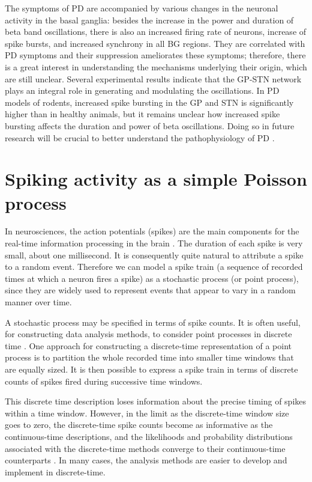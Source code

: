 \documentclass{kththesis}
\begin{document}
The symptoms of PD are accompanied by various changes in the neuronal activity in the basal ganglia: besides the increase in the power and duration of beta band oscillations, there is also an increased firing rate of neurons, increase of spike bursts, and increased synchrony in all BG regions. 
They are correlated with PD symptoms and their suppression ameliorates these symptoms; therefore, there is a great interest in understanding the mechanisms underlying their origin, which are still unclear. 
Several experimental results indicate that the GP-STN network plays an integral role in generating and modulating the oscillations.
In PD models of rodents, increased spike bursting in the GP and STN is significantly higher than in healthy animals, but it remains unclear how increased spike bursting affects the duration and power of beta oscillations. 
Doing so in future research will be crucial to better understand the pathophysiology of PD \parencite{Bahu}.

\section{Spiking activity as a simple Poisson process}

In neurosciences, the action potentials (spikes) are the main components for the real-time information processing in the brain \parencite{Eden}. 
The duration of each spike is very small, about one millisecond. 
It is consequently quite natural to attribute a spike to a random event. 
Therefore we can model a spike train (a sequence of recorded times at which a neuron fires a spike) as a stochastic process (or point process), since they are widely used to represent events that appear to vary in a random manner over time.

A stochastic process may be specified in terms of spike counts. 
It is often useful, for constructing data analysis methods, to consider point processes in discrete time \parencite{Eden}. 
One approach for constructing a discrete-time representation of a point process is to partition the whole recorded time into smaller time windows that are equally sized. 
It is then possible to express a spike train in terms of discrete counts of spikes fired during successive time windows. 

This discrete time description loses information about the precise timing of spikes within a time window. 
However, in the limit as the discrete-time window size goes to zero, the discrete-time spike counts become as informative as the continuous-time descriptions, and the likelihoods and probability distributions associated with the discrete-time methods converge to their continuous-time counterparts \parencite{Eden}. 
In many cases, the analysis methods are easier to develop and implement in discrete-time.    
\end{document}
